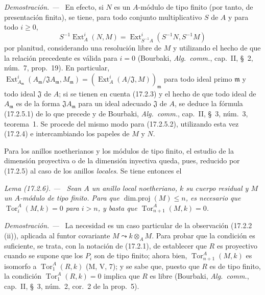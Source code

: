 \documentclass[10pt,oneside]{book}
\makeatletter
\newcommand{\setmanualcurrentlabel}[1]{\def\@currentlabel{#1}}
\newcommand{\oldpage}[2][]{%
  \setcounter{footnote}{0}%
  \marginpar{\scriptsize\textbf{#1}~|~#2}\ignorespaces}
\newenvironment{lemma}[1][]{%
  \setmanualcurrentlabel{#1}\par\medskip\noindent\itshape Lema (#1). ---\ }{\par}
\newenvironment{proof}{%
  \par\medskip\noindent\textit{Demostración. ---\ }}{\par}
\makeatother
\begin{document}
\begin{proof}
En efecto, si $N$ es un $A$-módulo de tipo finito (por tanto, de presentación finita),
se tiene, para todo conjunto multiplicativo $S$ de $A$ y para todo $i\geq0$,
\[
  S^{-1}\operatorname{Ext}^i_A(N,M)
  =\operatorname{Ext}^i_{S^{-1}A}(S^{-1}N,S^{-1}M)
\]
por planitud, considerando una resolución libre de $M$ y utilizando el
hecho de que la relación precedente es válida para $i=0$ (Bourbaki,
\emph{Alg.~comm.}, cap.~II, \S~2, núm.~7, prop.~19). En particular,
$\operatorname{Ext}^i_{A_{\mathfrak{m}}}
(A_{\mathfrak{m}}/\mathfrak{J}A_{\mathfrak{m}},M_{\mathfrak{m}})
=(\operatorname{Ext}^i_A(A/\mathfrak{J},M))_{\mathfrak{m}}$ para todo ideal
primo $\mathfrak{m}$ y todo ideal $\mathfrak{J}$ de $A$; si se tienen
en cuenta (17.2.3) y el hecho de que todo
\oldpage[0\textsubscript{IV-1}]{44}
ideal de $A_{\mathfrak{m}}$ es de la forma $\mathfrak{J}A_{\mathfrak{m}}$
para un ideal adecuado $\mathfrak{J}$ de $A$, se deduce la fórmula
(17.2.5.1) de lo que precede y de Bourbaki, \emph{Alg.~comm.}, cap.~II,
\S~3, núm.~3, teorema~1. Se procede del mismo modo para (17.2.5.2), utilizando esta vez
(17.2.4) e intercambiando los papeles de $M$ y $N$.
\end{proof}

Para los anillos noetherianos y los módulos de tipo finito, el estudio de la
dimensión proyectiva o de la dimensión inyectiva queda, pues, reducido por
(17.2.5) al caso de los anillos \emph{locales}. Se tiene entonces el

\begin{lemma}[17.2.6]
\label{0.17.2.6-es}
Sean $A$ un anillo local noetheriano, $k$ su cuerpo residual y $M$ un
$A$-módulo de tipo finito. Para que $\operatorname{dim.proj}(M)\leq n$, es
necesario que $\operatorname{Tor}^A_i(M,k)=0$ para $i>n$, y basta que
$\operatorname{Tor}^A_{n+1}(M,k)=0$.
\end{lemma}

\begin{proof}
La necesidad es un caso particular de la observación (17.2.2 (ii)), aplicada al
funtor covariante $M\leadsto k\otimes_A M$. Para probar que la condición es
suficiente, se trata, con la notación de (17.2.1), de establecer que $R$ es
proyectivo cuando se supone que los $P_i$ son de tipo finito; ahora bien,
$\operatorname{Tor}^A_{n+1}(M,k)$ es isomorfo a
$\operatorname{Tor}^A_1(R,k)$ (M, V, 7); y se sabe que, puesto que $R$ es de
tipo finito, la condición $\operatorname{Tor}^A_1(R,k)=0$ implica que $R$ es
libre (Bourbaki, \emph{Alg.~comm.}, cap.~II, \S~3, núm.~2, cor.~2 de la
prop.~5).
\end{proof}
\end{document}
